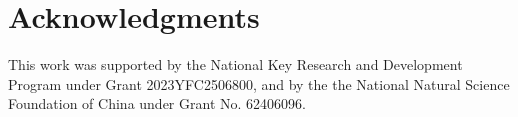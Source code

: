 \section{Acknowledgments}
This work was supported by the National Key Research and Development Program under Grant 2023YFC2506800, and by the the National Natural Science Foundation of China under Grant No. 62406096.